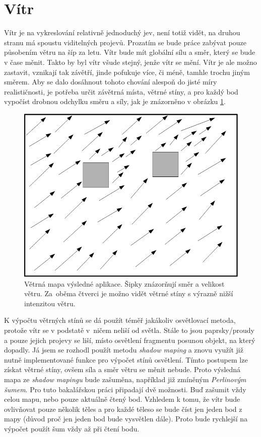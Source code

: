 \section{Vítr}
Vítr je na vykreslování relativně jednoduchý jev, není totiž vidět, na druhou stranu má spoustu viditelných projevů. Prozatím se bude práce zabývat pouze působením větru na šíp za letu.
Vítr bude mít globální sílu a směr, který se bude v čase měnit. Takto by byl vítr všude stejný, jenže vítr se mění. Vítr je ale možno zastavit, vznikají tak závětří, jinde pofukuje více, či méně, tamhle trochu jiným směrem. Aby se dalo dosáhnout tohoto chování alespoň do jisté míry realističnosti, je potřeba určit závětrná místa, větrné stíny, a pro každý bod vypočíst drobnou odchylku směru a síly, jak je znázorněno v obrázku \ref{windmap}.

\begin{figure}
	\begin{center}
		\includegraphics[scale=0.5]{obrazky-figures/windMap}
		\caption{Větrná mapa výsledné aplikace. Šipky znázorňují směr a velikost větru. Za~oběma čtverci je možno vidět větrné stíny s výrazně nižší intenzitou větru.}\label{windmap}
\end{center}\end{figure}
K výpočtu větrných stínů se dá použít téměř jakákoliv osvětlovací metoda, protože vítr se v podstatě v~ničem neliší od světla. Stále to jsou paprsky/proudy a pouze jejich projevy se liší, místo osvětlení fragmentu posunou objekt, na který dopadly. Já jsem se rozhodl použít metodu \emph{shadow maping} a znovu využít již nutně implementované funkce pro výpočet stínů osvětlení. Tímto postupem lze získat větrné stíny, ovšem síla a směr větru se měnit nebude. Proto výsledná mapa ze \emph{shadow mapingu} bude zašuměna, například již zmíněným \emph{Perlinovým šumem}. Pro tuto bakalářskou práci připadají dvě možnosti. Buď zašumit vždy celou mapu, nebo pouze aktuálně čtený bod. Vzhledem k tomu, že vítr bude ovlivňovat pouze několik těles a pro každé těleso se bude číst jen jeden bod z mapy (důvod proč jen jeden bod bude vysvětlen dále). Proto bude rychlejší na výpočet použít šum vždy až při čtení bodu.

